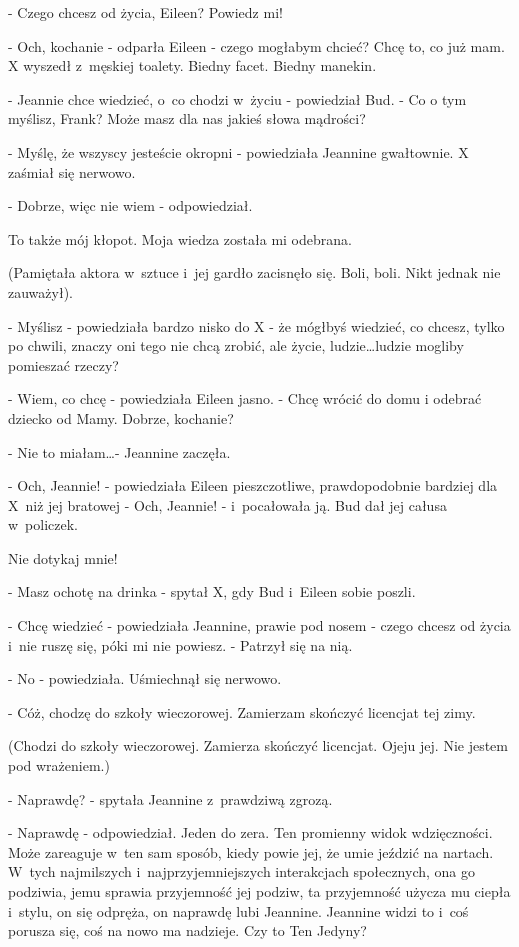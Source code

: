 \documentclass[oneside,polish,12pt,sfheadings]{mwbk}
\begin{document}
- Czego chcesz od życia, Eileen?
Powiedz mi!

- Och, kochanie - odparła Eileen - czego mogłabym chcieć? Chcę to,
co już mam. X wyszedł z~męskiej toalety. Biedny facet. Biedny manekin.

- Jeannie chce wiedzieć, o~co chodzi w~życiu - powiedział Bud. - Co
o tym myślisz, Frank? Może masz dla nas jakieś słowa mądrości?

- Myślę, że wszyscy jesteście okropni - powiedziała Jeannine gwałtownie.
X zaśmiał się nerwowo.

- Dobrze, więc nie wiem - odpowiedział.

To także mój kłopot. Moja wiedza została mi odebrana.

(Pamiętała aktora w~sztuce i~jej gardło zacisnęło się. Boli, boli.
Nikt jednak nie zauważył).

- Myślisz - powiedziała bardzo nisko do X - że mógłbyś wiedzieć, co
chcesz, tylko po chwili, znaczy oni tego nie chcą zrobić, ale życie,
ludzie\ldots ludzie mogliby pomieszać rzeczy?

- Wiem, co chcę - powiedziała Eileen jasno. - Chcę wrócić do domu
i odebrać dziecko od Mamy. Dobrze, kochanie?

- Nie to miałam\ldots - Jeannine zaczęła.

- Och, Jeannie! - powiedziała Eileen pieszczotliwe, prawdopodobnie
bardziej dla X~niż jej bratowej - Och, Jeannie! - i~pocałowała ją.
Bud dał jej całusa w~policzek.

Nie dotykaj mnie!

- Masz ochotę na drinka - spytał X, gdy Bud i~Eileen sobie poszli.

- Chcę wiedzieć - powiedziała Jeannine, prawie pod nosem - czego chcesz
od życia i~nie ruszę się, póki mi nie powiesz. - Patrzył się na nią.

- No - powiedziała. Uśmiechnął się nerwowo.

- Cóż, chodzę do szkoły wieczorowej. Zamierzam skończyć licencjat
tej zimy.

(Chodzi do szkoły wieczorowej. Zamierza skończyć licencjat. Ojeju
jej. Nie jestem pod wrażeniem.)

- Naprawdę? - spytała Jeannine z~prawdziwą zgrozą.

- Naprawdę - odpowiedział. Jeden do zera. Ten promienny widok wdzięczności.
Może zareaguje w~ten sam sposób, kiedy powie jej, że umie jeździć
na nartach. W~tych najmilszych i~najprzyjemniejszych interakcjach
społecznych, ona go podziwia, jemu sprawia przyjemność jej podziw,
ta przyjemność użycza mu ciepła i~stylu, on się odpręża, on naprawdę
lubi Jeannine. Jeannine widzi to i~coś porusza się, coś na nowo ma
nadzieje. Czy to Ten Jedyny?
\end{document}
